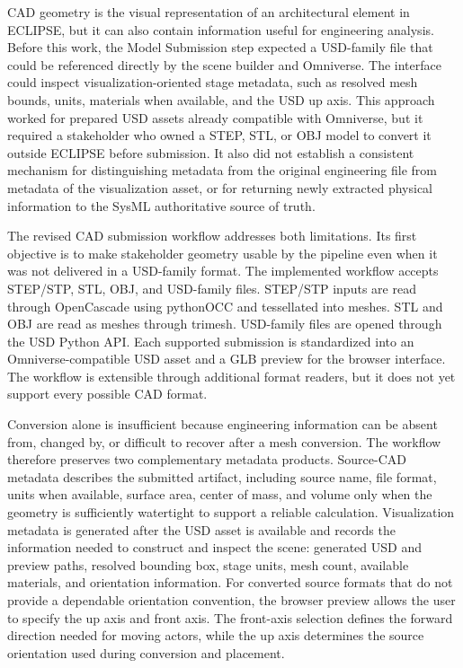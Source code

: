 CAD geometry is the visual representation of an architectural element in ECLIPSE, but it can also contain information useful for engineering analysis. Before this work, the Model Submission step expected a USD-family file that could be referenced directly by the scene builder and Omniverse. The interface could inspect visualization-oriented stage metadata, such as resolved mesh bounds, units, materials when available, and the USD up axis. This approach worked for prepared USD assets already compatible with Omniverse, but it required a stakeholder who owned a STEP, STL, or OBJ model to convert it outside ECLIPSE before submission. It also did not establish a consistent mechanism for distinguishing metadata from the original engineering file from metadata of the visualization asset, or for returning newly extracted physical information to the SysML authoritative source of truth.

The revised CAD submission workflow addresses both limitations. Its first objective is to make stakeholder geometry usable by the pipeline even when it was not delivered in a USD-family format. The implemented workflow accepts STEP/STP, STL, OBJ, and USD-family files. STEP/STP inputs are read through OpenCascade using pythonOCC and tessellated into meshes. STL and OBJ are read as meshes through trimesh. USD-family files are opened through the USD Python API. Each supported submission is standardized into an Omniverse-compatible USD asset and a GLB preview for the browser interface. The workflow is extensible through additional format readers, but it does not yet support every possible CAD format.

Conversion alone is insufficient because engineering information can be absent from, changed by, or difficult to recover after a mesh conversion. The workflow therefore preserves two complementary metadata products. Source-CAD metadata describes the submitted artifact, including source name, file format, units when available, surface area, center of mass, and volume only when the geometry is sufficiently watertight to support a reliable calculation. Visualization metadata is generated after the USD asset is available and records the information needed to construct and inspect the scene: generated USD and preview paths, resolved bounding box, stage units, mesh count, available materials, and orientation information. For converted source formats that do not provide a dependable orientation convention, the browser preview allows the user to specify the up axis and front axis. The front-axis selection defines the forward direction needed for moving actors, while the up axis determines the source orientation used during conversion and placement.

